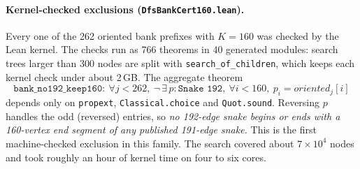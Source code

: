 \documentclass[11pt,a4paper]{article}
\theoremstyle{definition}
\begin{document}
\paragraph{Kernel-checked exclusions (\texttt{DfsBankCert160.lean}).} Every one of the 262 oriented bank prefixes with $K=160$ was checked by the Lean kernel. The checks run as 766 theorems in 40 generated modules: search trees larger than 300 nodes are split with \texttt{search\_of\_children}, which keeps each kernel check under about 2\,GB. The aggregate theorem
\[
\texttt{bank\_no192\_keep160}:\ \forall j<262,\ \neg\,\exists\,p:\texttt{Snake 192},\ \forall i<160,\ p_i=\mathit{oriented}_j[i]
\]
depends only on \texttt{propext}, \texttt{Classical.choice} and \texttt{Quot.sound}. Reversing $p$ handles the odd (reversed) entries, so \emph{no 192-edge snake begins or ends with a 160-vertex end segment of any published 191-edge snake.} This is the first machine-checked exclusion in this family. The search covered about $7\times10^4$ nodes and took roughly an hour of kernel time on four to six cores.
\end{document}
